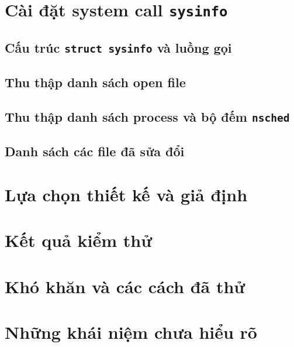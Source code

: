 \section{Cài đặt system call \texttt{sysinfo}}

\subsection{Cấu trúc \texttt{struct sysinfo} và luồng gọi}

\subsection{Thu thập danh sách open file}

\subsection{Thu thập danh sách process và bộ đếm \texttt{nsched}}

\subsection{Danh sách các file đã sửa đổi}

\section{Lựa chọn thiết kế và giả định}

\section{Kết quả kiểm thử}

\section{Khó khăn và các cách đã thử}

\section{Những khái niệm chưa hiểu rõ}

\nocite{*}
